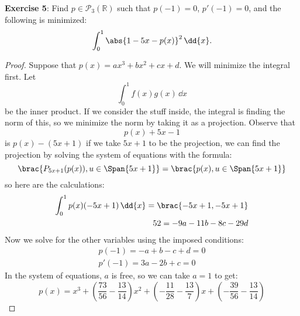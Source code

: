 \documentclass{article}
\begin{document}
\textbf{Exercise 5}: Find $p \in \mathcal{P}_{3}(\mathbb{R})$ such that $p(-1) = 0$, $p'(-1) = 0$, and the following is minimized:
\begin{equation*}
	\int_{0}^{1} \abs{1 - 5x - p(x)}^{2} \,\dd{x}.
\end{equation*}
\begin{proof}
	Suppose that $p(x) = ax^{3} + bx^{2} + cx + d$. We will minimize the integral first. Let 
	\begin{equation*}
		\int_{0}^{1} f(x)g(x) \,\dd{x}
	\end{equation*}
	be the inner product. If we consider the stuff inside, the integral is finding the norm of this, so we minimize the norm by taking it as a projection. Observe that 
	\begin{equation*}
		p(x) + 5x - 1
	\end{equation*}
	is $p(x) - (5x + 1)$ if we take $5x + 1$ to be the projection, we can find the projection by solving the system of equations with the formula:
	\begin{equation*}
		\brac{P_{5x + 1}(p(x)), u \in \Span\{5x + 1\}} = \brac{p(x), u \in \Span\{5x + 1\}}
	\end{equation*}
	so here are the calculations:
	\begin{align*}
		\int_{0}^{1} p(x)(-5x + 1) \,\dd{x} = \brac{-5x + 1, -5x + 1} \\
		52 = -9a - 11b - 8c - 29d
	\end{align*}
	Now we solve for the other variables using the imposed conditions:
	\begin{align*}
		p(-1) = -a + b - c + d = 0\\
		p'(-1) = 3a - 2b + c = 0
	\end{align*}
	In the system of equations, $a$ is free, so we can take $a = 1$ to get:
	\begin{equation*}
		p(x) = x^{3} + \left(\dfrac{73}{56} - \dfrac{13}{14}\right)x^{2} + \left(-\dfrac{11}{28} - \dfrac{13}{7}\right)x + \left(-\dfrac{39}{56} - \dfrac{13}{14}\right)
	\end{equation*}
\end{proof}
\end{document}
